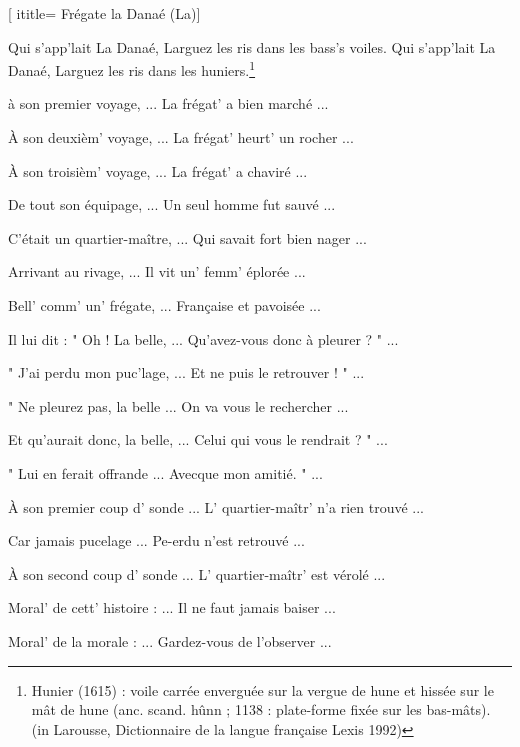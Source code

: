  [
ititle= {Frégate la Danaé (La)}]


\beginverse
{}
Qui s'app'lait La Danaé,
Larguez les ris dans les bass's voiles.
Qui s'app'lait La Danaé,
Larguez les ris dans les huniers.\footnote {Hunier (1615) : voile carrée enverguée sur la vergue de hune et hissée sur le mât de hune (anc. scand. hûnn ; 1138 : plate-forme fixée sur les bas-mâts). (in Larousse, Dictionnaire de la langue française Lexis 1992)}
\endverse

\beginverse
à son premier voyage, ...
La frégat' a bien marché ...
\endverse

\beginverse
À son deuxièm' voyage, ...
La frégat' heurt' un rocher ...
\endverse

\beginverse
À son troisièm' voyage, ...
La frégat' a chaviré ...
\endverse

\beginverse
De tout son équipage, ...
Un seul homme fut sauvé ...
\endverse

\beginverse
C'était un quartier-maître, ...
Qui savait fort bien nager ...
\endverse

\beginverse
Arrivant au rivage, ...
Il vit un' femm' éplorée ...
\endverse

\beginverse
Bell' comm' un' frégate, ...
Française et pavoisée ...
\endverse

\beginverse
Il lui dit : " Oh ! La belle, ...
Qu'avez-vous donc à pleurer ? " ...
\endverse

\beginverse
" J'ai perdu mon puc'lage, ...
Et ne puis le retrouver ! " ...
\endverse

\beginverse
" Ne pleurez pas, la belle ...
On va vous le rechercher ...
\endverse

\beginverse
Et qu'aurait donc, la belle, ...
Celui qui vous le rendrait ? " ...
\endverse

\beginverse
" Lui en ferait offrande ...
Avecque mon amitié. " ...
\endverse

\beginverse
À son premier coup d' sonde ...
L' quartier-maîtr' n'a rien trouvé ...
\endverse

\beginverse
Car jamais pucelage ...
Pe-erdu n'est retrouvé ...
\endverse

\beginverse
À son second coup d' sonde ...
L' quartier-maîtr' est vérolé ...
\endverse

\beginverse
Moral' de cett' histoire : ...
Il ne faut jamais baiser ...
\endverse

\beginverse
Moral' de la morale : ...
Gardez-vous de l'observer ...
\endverse

\endsong
